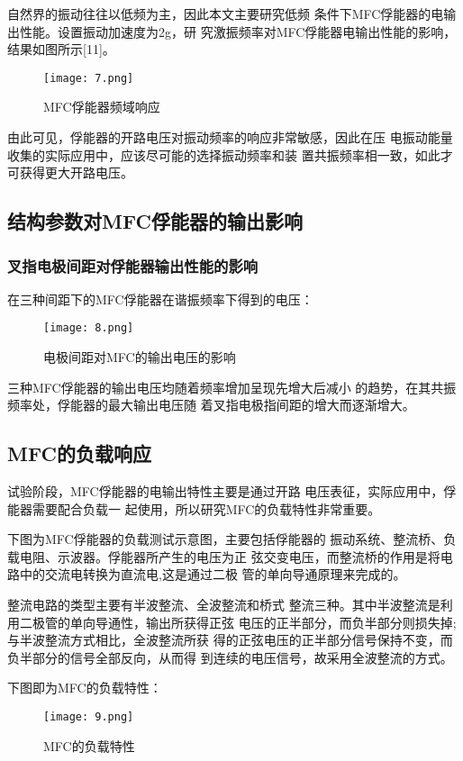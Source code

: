 \documentclass[lang=cn,11pt,a4paper,cite=authoryear]{elegantpaper}
\begin{document}
自然界的振动往往以低频为主，因此本文主要研究低频
条件下MFC俘能器的电输出性能。设置振动加速度为2g，研
究激振频率对MFC俘能器电输出性能的影响，结果如图所示[11]。

\begin{figure}[htbp]
  \centering
  \texttt{[image: 7.png]}
  \caption{MFC俘能器频域响应}
\end{figure}

由此可见，俘能器的开路电压对振动频率的响应非常敏感，因此在压
电振动能量收集的实际应用中，应该尽可能的选择振动频率和装
置共振频率相一致，如此才可获得更大开路电压。


\subsection{结构参数对MFC俘能器的输出影响}
\subsubsection{叉指电极间距对俘能器输出性能的影响}

在三种间距下的MFC俘能器在谐振频率下得到的电压：

\begin{figure}[htbp]
  \centering
  \texttt{[image: 8.png]}
  \caption{电极间距对MFC的输出电压的影响}
\end{figure}

三种MFC俘能器的输出电压均随着频率增加呈现先增大后减小
的趋势，在其共振频率处，俘能器的最大输出电压随
着叉指电极指间距的增大而逐渐增大。

\subsection{MFC的负载响应}

试验阶段，MFC俘能器的电输出特性主要是通过开路
电压表征，实际应用中，俘能器需要配合负载一
起使用，所以研究MFC的负载特性非常重要。
  
下图为MFC俘能器的负载测试示意图，主要包括俘能器的
振动系统、整流桥、负载电阻、示波器。俘能器所产生的电压为正
弦交变电压，而整流桥的作用是将电路中的交流电转换为直流电,这是通过二极
管的单向导通原理来完成的。
  
整流电路的类型主要有半波整流、全波整流和桥式
整流三种。其中半波整流是利用二极管的单向导通性，输出所获得正弦
电压的正半部分，而负半部分则损失掉;与半波整流方式相比，全波整流所获
得的正弦电压的正半部分信号保持不变，而负半部分的信号全部反向，从而得
到连续的电压信号，故采用全波整流的方式。

下图即为MFC的负载特性：
\begin{figure}[htbp]
  \centering
  \texttt{[image: 9.png]}
  \caption{MFC的负载特性}
\end{figure}
\end{document}
